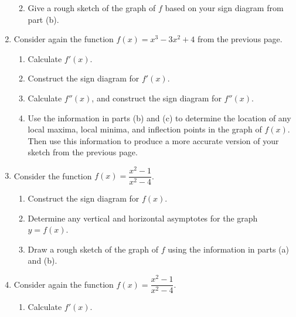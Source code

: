 \documentclass[12pt]{article}
\newcommand{\points}[1]{\marginpar{\hspace{24pt}[#1]}}
\begin{document}
\begin{enumerate}
\begin{enumerate}
\vspace{1.5in}

 \item Give a rough sketch of the graph of $f$ based on your sign diagram from part (b). \points{2}
\end{enumerate}
\newpage

\item Consider again the function $f(x)=x^3-3x^2+4$ from the previous page.
\begin{enumerate}
 \item Calculate $f'(x)$. \points{2}

\vspace{1in}

 \item Construct the sign diagram for $f'(x)$. \points{2}

\vspace{1in}

 \item Calculate $f''(x)$, and construct the sign diagram for $f''(x)$. \points{3}

\vspace{1.5in}

 \item Use the information in parts (b) and (c) to determine the location of any local maxima, local minima, and inflection points in the graph of $f(x)$. Then use this information to produce a more accurate version of your sketch from the previous page. \points{5}
\end{enumerate}
\newpage

\item Consider the function $f(x) = \dfrac{x^2-1}{x^2-4}$.
\begin{enumerate}
 \item Construct the sign diagram for $f(x)$.  \points{3}

\vspace{2.5in}

 \item Determine any vertical and horizontal asymptotes for the graph $y=f(x)$. \points{3}

\vspace{2in}

 \item Draw a rough sketch of the graph of $f$ using the information in parts (a) and (b). \points{4}
\end{enumerate}
\newpage

\item Consider again the function $f(x) = \dfrac{x^2-1}{x^2-4}$.
\begin{enumerate}
 \item Calculate $f'(x)$. \points{3}


\end{enumerate}
\end{enumerate}
\end{document}
